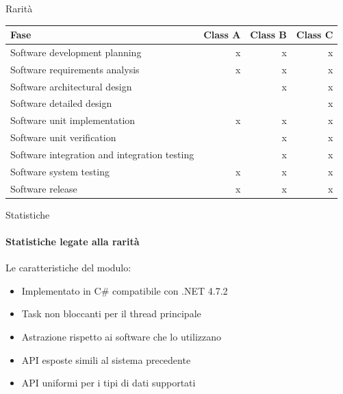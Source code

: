 \documentclass{beamer}
\begin{document}
\begin{darkframes}
\begin{frame}{Rarità}
    \begin{table}[!b]
      {\carlitoTLF %
        \begin{tabularx}{\textwidth}{Xrrr}
          \textbf{Fase}                                & \textbf{Class A} & \textbf{Class B} & \textbf{Class C} \\
          \toprule
          Software development planning                & x                & x                & x                \\
          Software requirements analysis               & x                & x                & x                \\
          Software architectural design                &                  & x                & x                \\
          Software detailed design                     &                  &                  & x                \\
          Software unit implementation                 & x                & x                & x                \\
          Software unit verification                   &                  & x                & x                \\
          Software integration and integration testing &                  & x                & x                \\
          Software system testing                      & x                & x                & x                \\
          Software release                             & x                & x                & x                \\
          \bottomrule
        \end{tabularx}}
    \end{table}

  \end{frame}

  \begin{frame}{Statistiche}
    \framesubtitle{Statistiche legate alla rarità}

    Le caratteristiche del modulo:
    \begin{itemize}
      \item Implementato in C\# compatibile con .NET 4.7.2
      \item Task non bloccanti per il thread principale
      \item Astrazione rispetto ai software che lo utilizzano
      \item API esposte simili al sistema precedente
      \item API uniformi per i tipi di dati supportati
    \end{itemize}
  \end{frame}


\end{darkframes}
\end{document}
